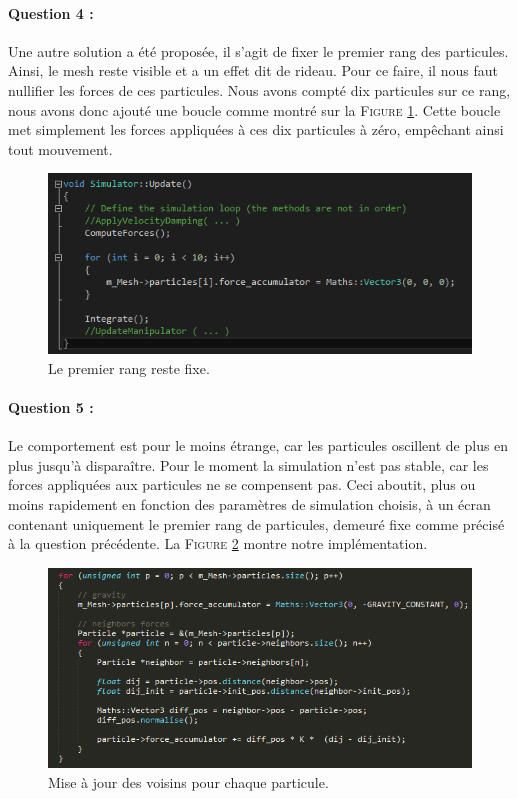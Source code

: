 \documentclass[a4paper,12pt]{article}
\begin{document}
\paragraph{Question 4 :} Une autre solution a été proposée, il s'agit de fixer le premier rang des particules. Ainsi, le mesh reste visible et a un effet dit \og{}de rideau\fg{}. Pour ce faire, il nous faut nullifier les forces de ces particules. Nous avons compté dix particules sur ce rang, nous avons donc ajouté une boucle comme montré sur la \textsc{Figure} \ref{fig:q4}. Cette boucle met simplement les forces appliquées à ces dix particules à zéro, empêchant ainsi tout mouvement.
\begin{figure}[ht!]
  \centering
  \includegraphics[width=\textwidth]{images/q4.png}
  \caption{Le premier rang reste fixe.}
  \label{fig:q4}
\end{figure}

\paragraph{Question 5 :} Le comportement est pour le moins étrange, car les particules oscillent de plus en plus jusqu'à disparaître. Pour le moment la simulation n'est pas stable, car les forces appliquées aux particules ne se compensent pas. Ceci aboutit, plus ou moins rapidement en fonction des paramètres de simulation choisis, à un écran contenant uniquement le premier rang de particules, demeuré fixe comme précisé à la question précédente.
La \textsc{Figure} \ref{fig:q5} montre notre implémentation.
\begin{figure}[ht!]
  \centering
  \includegraphics[width=\textwidth]{images/q5.png}
  \caption{Mise à jour des voisins pour chaque particule.}
  \label{fig:q5}
\end{figure}
\end{document}
